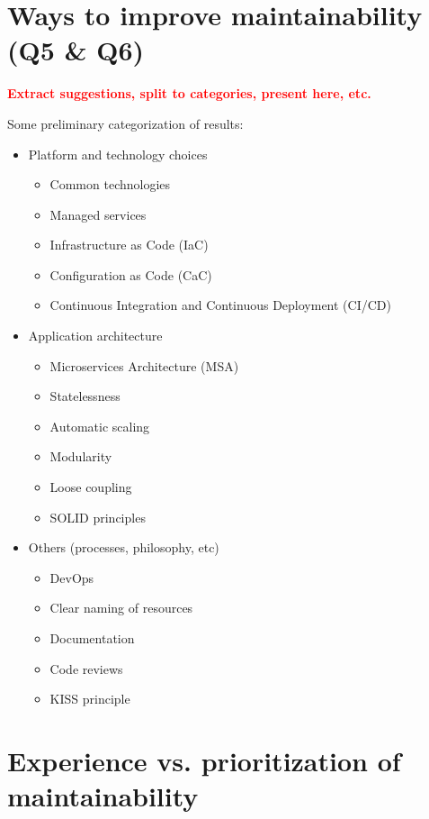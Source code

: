\documentclass[utf8,english]{gradu3}
\newcommand{\todo}[1]{\textbf{\textcolor{red}{#1}}}
\begin{document}
\section{Ways to improve maintainability (Q5 \& Q6)}

\todo{%
  Extract suggestions, split to categories, present here, etc.
}

Some preliminary categorization of results:
\begin{itemize}
  \item Platform and technology choices
        \begin{itemize}
          \item Common technologies
          \item Managed services
          \item Infrastructure as Code (IaC)
          \item Configuration as Code (CaC)
          \item Continuous Integration and Continuous Deployment (CI/CD)
        \end{itemize}
  \item Application architecture
        \begin{itemize}
          \item Microservices Architecture (MSA)
          \item Statelessness
          \item Automatic scaling
          \item Modularity
          \item Loose coupling
          \item SOLID principles
        \end{itemize}
  \item Others (processes, philosophy, etc)
        \begin{itemize}
          \item DevOps
          \item Clear naming of resources
          \item Documentation
          \item Code reviews
          \item KISS principle
        \end{itemize}
\end{itemize}

\section{Experience vs. prioritization of maintainability}
\end{document}
